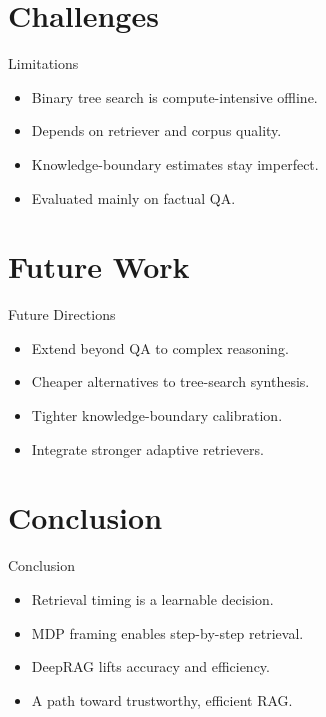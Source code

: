 \documentclass{beamer}
\begin{document}
\section{Challenges}
\begin{frame}{Limitations}
\begin{itemize}
\item Binary tree search is compute-intensive offline.
\item Depends on retriever and corpus quality.
\item Knowledge-boundary estimates stay imperfect.
\item Evaluated mainly on factual QA.
\end{itemize}
\end{frame}

\section{Future Work}
\begin{frame}{Future Directions}
\begin{itemize}
\item Extend beyond QA to complex reasoning.
\item Cheaper alternatives to tree-search synthesis.
\item Tighter knowledge-boundary calibration.
\item Integrate stronger adaptive retrievers.
\end{itemize}
\end{frame}

\section{Conclusion}
\begin{frame}{Conclusion}
\begin{itemize}
\item Retrieval timing is a learnable decision.
\item MDP framing enables step-by-step retrieval.
\item DeepRAG lifts accuracy and efficiency.
\item A path toward trustworthy, efficient RAG.
\end{itemize}
\end{frame}
\end{document}
